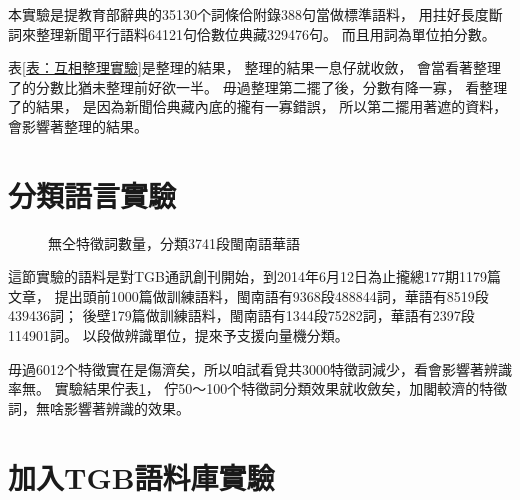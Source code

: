 本實驗是提教育部辭典的35130个詞條佮附錄388句當做標準語料，
用拄好長度斷詞來整理新聞平行語料64121句佮數位典藏329476句。
而且用詞為單位拍分數。

表\ref{表：互相整理實驗}是整理的結果，
整理的結果一息仔就收斂，
會當看著整理了的分數比猶未整理前好欲一半。
毋過整理第二擺了後，分數有降一寡，
看整理了的結果，
是因為新聞佮典藏內底的攏有一寡錯誤，
所以第二擺用著遮的資料，
會影響著整理的結果。



\section{分類語言實驗}
\label{節：判斷語言實驗}

\begin{figure}
\caption{無仝特徵詞數量，分類3741段閩南語華語}
\label{圖：無仝特徵詞數量對分類閩南語華語效果的影響}
\end{figure}

這節實驗的語料是對TGB通訊創刊開始，到2014年6月12日為止攏總177期1179篇文章，
提出頭前1000篇做訓練語料，閩南語有9368段488844詞，華語有8519段439436詞；
後壁179篇做訓練語料，閩南語有1344段75282詞，華語有2397段114901詞。
以段做辨識單位，提來予支援向量機分類。

毋過6012个特徵實在是傷濟矣，所以咱試看覓共3000特徵詞減少，看會影響著辨識率無。
實驗結果佇表\ref{圖：無仝特徵詞數量對分類閩南語華語效果的影響}，
佇50～100个特徵詞分類效果就收斂矣，加閣較濟的特徵詞，無啥影響著辨識的效果。

\section{加入TGB語料庫實驗}
\label{節：加入TGB語料庫實驗}

